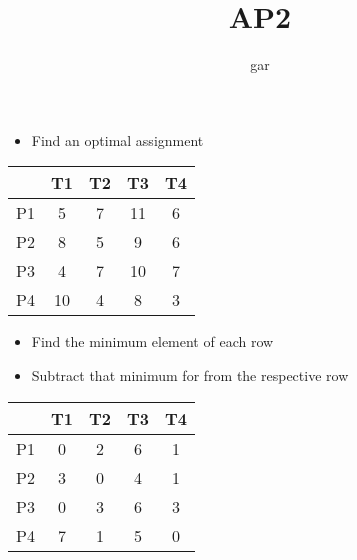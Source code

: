 \documentclass[12pt]{beamer}
\title{AP2}
\author{gar}
\date{}
\begin{document}
\maketitle

\begin{frame}[fragile]

\begin{itemize}
\item Find an optimal assignment
\end{itemize}

\begin{center}
\begin{tabular}{|c|cccc|}
\hline
   & T1 & T2 & T3 & T4 \\
\hline
P1 & 5  & 7  & 11 & 6  \\
P2 & 8  & 5  & 9  & 6  \\
P3 & 4  & 7  & 10 & 7  \\
P4 & 10 & 4  & 8  & 3  \\
\hline
\end{tabular}
\end{center}

\end{frame}

\begin{frame}[fragile]
\begin{itemize}
\item Find the minimum element of each row
\item Subtract that minimum for from the respective row
\end{itemize}


\begin{center}
\begin{tabular}{|c|cccc|}
\hline
   & T1 & T2 & T3 & T4 \\
\hline
P1 & 0  & 2  & 6  & 1  \\
P2 & 3  & 0  & 4  & 1  \\
P3 & 0  & 3  & 6  & 3  \\
P4 & 7  & 1  & 5  & 0  \\
\hline
\end{tabular}
\end{center}

\end{frame}
\end{document}
